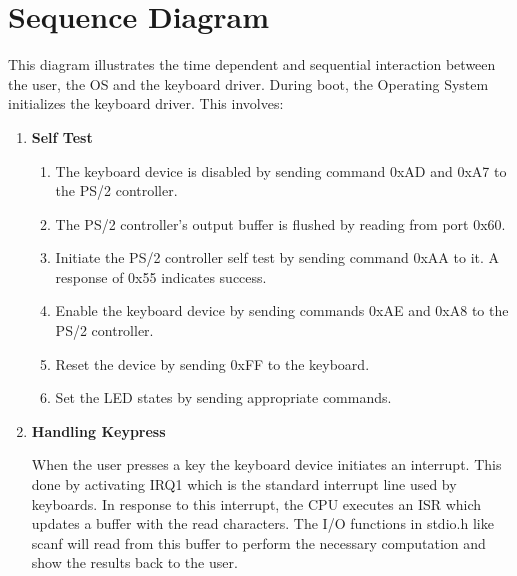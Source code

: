 \clearpage

\section{Sequence Diagram}

\begin{flushleft}
	This diagram illustrates the time dependent and sequential interaction between the
	user, the OS and the keyboard driver.
	During boot, the Operating System initializes the keyboard driver.
	This involves:
	\begin{enumerate}
		\item \textbf{Self Test}
		\begin{enumerate}
			\item The keyboard device is disabled by sending command 0xAD and 0xA7 to
			the PS/2 controller.
			\item The PS/2 controller's output buffer is flushed by reading from port 0x60.
			\item Initiate the PS/2 controller self test by sending command 0xAA to it. A
			response of 0x55 indicates success.
			\item Enable the keyboard device by sending commands 0xAE and 0xA8 to the
			PS/2 controller.
			\item Reset the device by sending 0xFF to the keyboard.
			\item Set the LED states by sending appropriate commands.
		\end{enumerate}
		\item \textbf{Handling Keypress}
		
		When the user presses a key the keyboard device initiates an interrupt. This done by
		activating IRQ1 which is the standard interrupt line used by keyboards. In response
		to this interrupt, the CPU executes an ISR which updates a buffer with the read
		characters. The I/O functions in stdio.h like scanf will read from this buffer to perform
		the necessary computation and show the results back to the user.
		
	\end{enumerate}
\end{flushleft}


